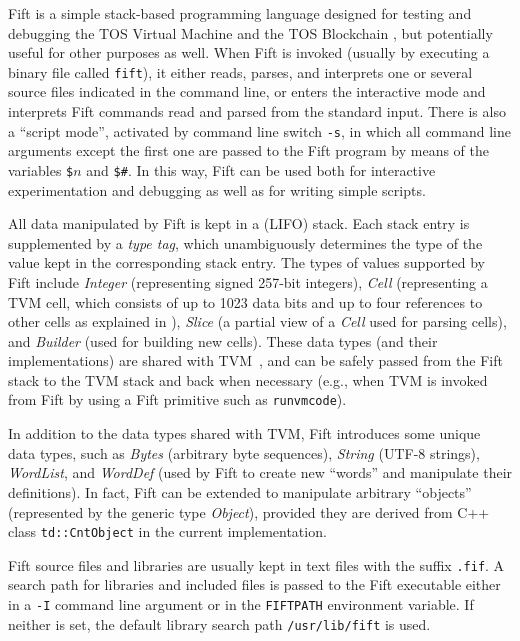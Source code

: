 \documentclass[12pt,oneside]{article}
\begin{document}
Fift is a simple stack-based programming language designed for testing and debugging the TOS Virtual Machine \cite{TVM} and the TOS Blockchain \cite{TBC}, but potentially useful for other purposes as well. When Fift is invoked (usually by executing a binary file called {\tt fift}), it either reads, parses, and interprets one or several source files indicated in the command line, or enters the interactive mode and interprets Fift commands read and parsed from the standard input. There is also a ``script mode'', activated by command line switch {\tt -s}, in which all command line arguments except the first one are passed to the Fift program by means of the variables {\tt \$$n$} and {\tt \$\#}. In this way, Fift can be used both for interactive experimentation and debugging as well as for writing simple scripts.

All data manipulated by Fift is kept in a (LIFO) stack. Each stack entry is supplemented by a {\em type tag}, which unambiguously determines the type of the value kept in the corresponding stack entry. The types of values supported by Fift include {\em Integer\/} (representing signed 257-bit integers), {\em Cell\/} (representing a TVM cell, which consists of up to 1023 data bits and up to four references to other cells as explained in \cite{TVM}), {\em Slice\/} (a partial view of a {\em Cell\/} used for parsing cells), and {\em Builder\/} (used for building new cells). These data types (and their implementations) are shared with TVM~\cite{TVM}, and can be safely passed from the Fift stack to the TVM stack and back when necessary (e.g., when TVM is invoked from Fift by using a Fift primitive such as {\tt runvmcode}).

In addition to the data types shared with TVM, Fift introduces some unique data types, such as {\em Bytes\/} (arbitrary byte sequences), {\em String\/} (UTF-8 strings), {\em WordList\/}, and {\em WordDef\/} (used by Fift to create new ``words'' and manipulate their definitions). In fact, Fift can be extended to manipulate arbitrary ``objects'' (represented by the generic type {\em Object}), provided they are derived from C++ class {\tt td::CntObject} in the current implementation.

Fift source files and libraries are usually kept in text files with the suffix {\tt .fif}. A search path for libraries and included files is passed to the Fift executable either in a {\tt -I} command line argument or in the {\tt FIFTPATH} environment variable. If neither is set, the default library search path {\tt /usr/lib/fift} is used.
\end{document}

